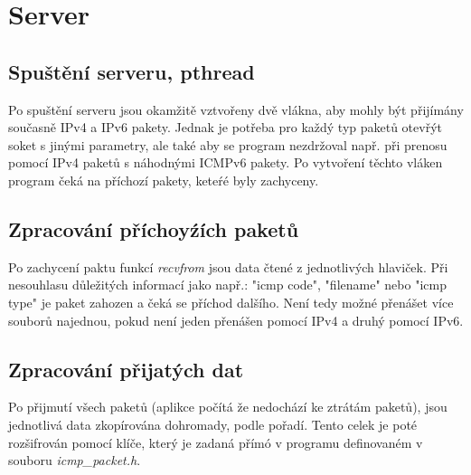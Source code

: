 \documentclass[a4paper, 11pt]{article}
\begin{document}
\newpage
\section{Server}

\subsection{Spuštění serveru, pthread}
Po spuštění serveru jsou okamžitě vztvořeny dvě vlákna, aby mohly být přijímány současně IPv4 a IPv6 pakety. Jednak je potřeba pro každý typ paketů otevřýt soket s jinými parametry, ale také aby se program nezdržoval např. při prenosu pomocí IPv4 paketů s náhodnými ICMPv6 pakety. Po vytvoření těchto vláken program čeká na příchozí pakety, keteŕé byly zachyceny.

\subsection{Zpracování příchoyźích paketů}
Po zachycení paktu funkcí \textit{recvfrom} jsou data čtené z jednotlivých hlaviček. Při nesouhlasu důležitých informací jako např.: "icmp code", "filename" nebo "icmp type" je paket zahozen a čeká se příchod dalšího. Není tedy možné přenášet více souborů najednou, pokud není jeden přenášen pomocí IPv4 a druhý pomocí IPv6.

\subsection{Zpracování přijatých dat}
Po přijmutí všech paketů (aplikce počítá že nedochází ke ztrátám paketů), jsou jednotlivá data zkopírována dohromady, podle pořadí. Tento celek je poté rozšifrován pomocí klíče, který je zadaná přímó v programu definovaném v souboru \textit{icmp\_packet.h}.
\end{document}
